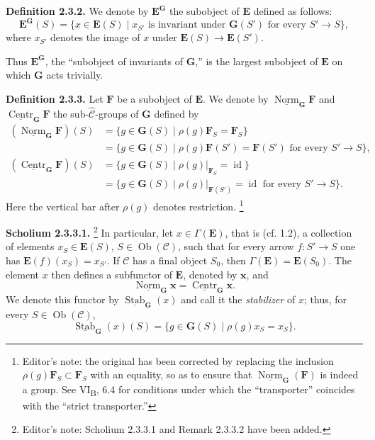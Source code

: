 \medskip
\noindent\textbf{Definition 2.3.2.}
We denote by \(\mathbf E^{\mathbf G}\) the subobject of \(\mathbf E\)
defined as follows:
\[
  \mathbf E^{\mathbf G}(S)
    =\bigl\{x\in\mathbf E(S)\mid
      x_{S'}\text{ is invariant under }\mathbf G(S')
      \text{ for every }S'\to S\bigr\},
\]
where \(x_{S'}\) denotes the image of \(x\) under
\(\mathbf E(S)\to\mathbf E(S')\).

Thus \(\mathbf E^{\mathbf G}\), the ``subobject of invariants of
\(\mathbf G\),'' is the largest subobject of \(\mathbf E\) on which
\(\mathbf G\) acts trivially.

\medskip
\noindent\textbf{Definition 2.3.3.}
Let \(\mathbf F\) be a subobject of \(\mathbf E\). We denote by
\(\underline{\operatorname{Norm}}_{\mathbf G}\mathbf F\) and
\(\underline{\operatorname{Centr}}_{\mathbf G}\mathbf F\) the
sub-\(\widehat{\mathscr C}\)-groups of \(\mathbf G\) defined by
\begin{align*}
  (\underline{\operatorname{Norm}}_{\mathbf G}\mathbf F)(S)
    &={}
      \{g\in\mathbf G(S)\mid \rho(g)\mathbf F_S=\mathbf F_S\}\\
    &={}
      \{g\in\mathbf G(S)\mid
        \rho(g)\mathbf F(S')=\mathbf F(S')
        \text{ for every }S'\to S\},\\
  (\underline{\operatorname{Centr}}_{\mathbf G}\mathbf F)(S)
    &={}
      \{g\in\mathbf G(S)\mid
        \rho(g)|_{\mathbf F_S}=\operatorname{id}\}\\
    &={}
      \{g\in\mathbf G(S)\mid
        \rho(g)|_{\mathbf F(S')}=\operatorname{id}
        \text{ for every }S'\to S\}.
\end{align*}
Here the vertical bar after \(\rho(g)\) denotes restriction.
\footnote{Editor's note: the original has been corrected by replacing
the inclusion \(\rho(g)\mathbf F_S\subset\mathbf F_S\) with an equality,
so as to ensure that
\(\underline{\operatorname{Norm}}_{\mathbf G}(\mathbf F)\) is indeed a
group. See VI\textsubscript{B}, 6.4 for conditions under which the
``transporter'' coincides with the ``strict transporter.''}

\medskip
\noindent\textbf{Scholium 2.3.3.1.}
\footnote{Editor's note: Scholium 2.3.3.1 and Remark 2.3.3.2 have been
added.}
In particular, let \(x\in\Gamma(\mathbf E)\), that is (cf. 1.2), a
collection of elements \(x_S\in\mathbf E(S)\),
\(S\in\operatorname{Ob}(\mathscr C)\), such that for every arrow
\(f:S'\to S\) one has
\(\mathbf E(f)(x_S)=x_{S'}\). If \(\mathscr C\) has a final object
\(S_0\), then \(\Gamma(\mathbf E)=\mathbf E(S_0)\). The element \(x\)
then defines a subfunctor of \(\mathbf E\), denoted by \(\mathbf x\),
and
\[
  \underline{\operatorname{Norm}}_{\mathbf G}\mathbf x
    =
  \underline{\operatorname{Centr}}_{\mathbf G}\mathbf x.
\]
We denote this functor by
\(\underline{\operatorname{Stab}}_{\mathbf G}(x)\) and call it the
\emph{stabilizer} of \(x\); thus, for every
\(S\in\operatorname{Ob}(\mathscr C)\),
\[
  \underline{\operatorname{Stab}}_{\mathbf G}(x)(S)
    =\{g\in\mathbf G(S)\mid\rho(g)x_S=x_S\}.
\]

